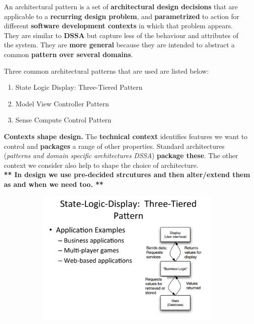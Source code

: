 \documentclass[a4paper]{report}
\begin{document}
An architectural pattern is a set of \textbf{architectural design decisions} that are applicable to a \textbf{recurring design problem}, and \textbf{parametrized} to action for different \textbf{software development contexts} in which that problem appears.\\

They are similar to \textbf{DSSA} but capture less of the behaviour and attributes of the system. They are \textbf{more general} because they are intended to abstract a common \textbf{pattern over several domains}.

Three common architectural patterns that are used are listed below:
\begin{enumerate}
\item State Logic Display: Three-Tiered Pattern
\item Model View Controller Pattern
\item Sense Compute Control Pattern\\
\end{enumerate}

\textbf{Contexts shape design.} The \textbf{technical context} identifies features we want to control and \textbf{packages} a range of other properties. Standard architectures (\textit{patterns and domain specific architectures DSSA}) \textbf{package these}. The other context we consider also help to shape the choice of architecture.\\

\textbf{** In design we use pre-decided strcutures and then alter/extend them as and when we need too. **}


\begin{figure}[H]
\hskip-2.5cm\begin{subfigure}{1.2\textwidth}
  \includegraphics[width=1.2\linewidth]
  {images/3-SLD-pattern}
\end{subfigure}
\end{figure}
\end{document}
